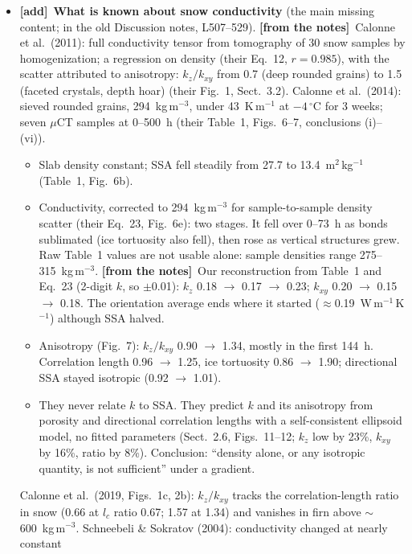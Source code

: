 \documentclass[11pt]{article}
\newcommand{\Note}{\textcolor{open}{\textbf{[from the notes]}}\ }
\newcommand{\tA}{\textcolor{have}{\textbf{[add]}}\ }
\begin{document}
\begin{enumerate}
\begin{itemize}
    porosity change that relation.
  \item \tA \textbf{What is known about snow conductivity} (the main missing
    content; in the old Discussion notes, L507--529). \Note Calonne et al.\
    (2011): full conductivity tensor from tomography of 30 snow samples by
    homogenization; a regression on density (their Eq.~12, $r = 0.985$),
    with the scatter attributed to anisotropy: $k_z/k_{xy}$ from 0.7 (deep
    rounded grains) to 1.5 (faceted crystals, depth hoar) (their Fig.~1,
    Sect.~3.2). Calonne et al.\ (2014): sieved rounded grains,
    294~kg\,m$^{-3}$, under 43~K\,m$^{-1}$ at $-4\,^\circ$C for 3 weeks;
    seven $\mu$CT samples at 0--500~h (their Table~1, Figs.~6--7,
    conclusions (i)--(vi)).
    \begin{itemize}
    \item Slab density constant; SSA fell steadily from 27.7 to
      13.4~m$^2$\,kg$^{-1}$ (Table~1, Fig.~6b).
    \item Conductivity, corrected to 294~kg\,m$^{-3}$ for sample-to-sample
      density scatter (their Eq.~23, Fig.~6e): two stages. It fell over
      0--73~h as bonds sublimated (ice tortuosity also fell), then rose as
      vertical structures grew. Raw Table~1 values are not usable alone:
      sample densities range 275--315~kg\,m$^{-3}$. \Note Our
      reconstruction from Table~1 and Eq.~23 (2-digit $k$, so
      $\pm$0.01): $k_z$ 0.18 $\to$ 0.17 $\to$ 0.23; $k_{xy}$ 0.20 $\to$
      0.15 $\to$ 0.18. The orientation average ends where it started
      ($\approx$0.19~W\,m$^{-1}$\,K$^{-1}$) although SSA halved.
    \item Anisotropy (Fig.~7): $k_z/k_{xy}$ 0.90 $\to$ 1.34, mostly in the
      first 144~h. Correlation length 0.96 $\to$ 1.25, ice tortuosity 0.86
      $\to$ 1.90; directional SSA stayed isotropic (0.92 $\to$ 1.01).
    \item They never relate $k$ to SSA. They predict $k$ and its
      anisotropy from porosity and directional correlation lengths with a
      self-consistent ellipsoid model, no fitted parameters (Sect.~2.6,
      Figs.~11--12; $k_z$ low by 23\%, $k_{xy}$ by 16\%, ratio by 8\%).
      Conclusion: ``density alone, or any isotropic quantity, is not
      sufficient'' under a gradient.
    \end{itemize}
    Calonne et al.\ (2019, Figs.~1c, 2b): $k_z/k_{xy}$
    tracks the correlation-length ratio in snow (0.66 at $l_c$ ratio 0.67;
    1.57 at 1.34) and vanishes in firn above $\sim$600~kg\,m$^{-3}$.
    Schneebeli \& Sokratov (2004): conductivity changed at nearly constant

\end{itemize}
\end{enumerate}
\end{document}
